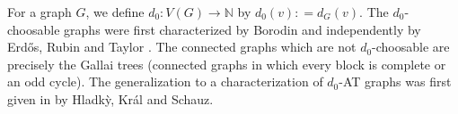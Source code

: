 \documentclass[12pt]{article}
\theoremstyle{plain}
\newtheorem{lem}[thm]{Lemma}
\theoremstyle{definition}
\newtheorem{defn}{Definition}
\theoremstyle{remark}
\newcommand{\IN}{\mathbb{N}}
\newcommand{\set}[1]{\left\{ #1 \right\}}
\newcommand{\card}[1]{\left|#1\right|}
\newcommand{\size}[1]{\left\Vert#1\right\Vert}
\newcommand{\func}[3]{#1\colon #2 \rightarrow #3}
\newcommand{\DefinedAs}{\mathrel{\mathop:}=}
\newcommand{\AT}{\operatorname{AT}}
\newcommand{\col}{\operatorname{col}}
\newcommand{\ch}{\operatorname{ch}}
\begin{document}



For a graph $G$, we define $\func{d_0}{V(G)}{\IN}$ by $d_0(v) \DefinedAs d_G(v)$.  The $d_0$-choosable graphs were first characterized by Borodin \cite{borodin1977criterion} and independently by Erd\H{o}s, Rubin and Taylor \cite{erdos1979choosability}.  The connected graphs which are not $d_0$-choosable are precisely the Gallai trees (connected graphs in which every block is complete or an odd cycle). The generalization to a characterization of $d_0$-AT graphs was first given in \cite{Hladky} by Hladk{\`y}, Kr{\'a}l and Schauz. 




\end{document}

